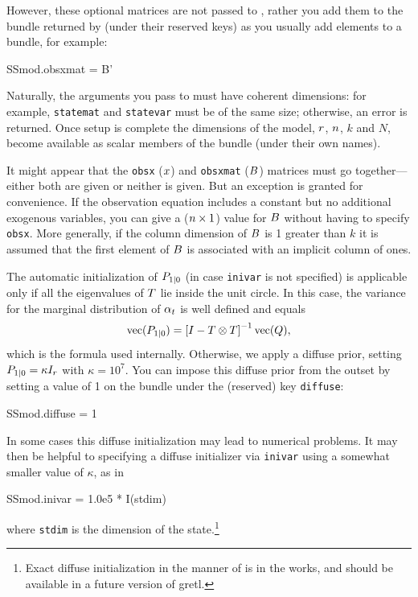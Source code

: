 However, these optional matrices are not passed to ,
rather you add them to the bundle returned by  (under
their reserved keys) as you usually add elements to a bundle, for
example:
\begin{code}
SSmod.obsxmat = B'
\end{code}

Naturally, the arguments you pass to  must have coherent
dimensions: for example, \texttt{statemat} and \texttt{statevar} must
be of the same size; otherwise, an error is returned. Once setup is
complete the dimensions of the model, $r$, $n$, $k$ and
$N$, become available as scalar members of the bundle (under their own
names).

It might appear that the \texttt{obsx} ($x$) and \texttt{obsxmat}
($B$) matrices must go together---either both are given or
neither is given.  But an exception is granted for convenience.  If
the observation equation includes a constant but no additional
exogenous variables, you can give a ($n \times 1$) value for
$B$ without having to specify \texttt{obsx}.  More generally,
if the column dimension of $B$ is 1 greater than $k$ it is
assumed that the first element of $B$ is associated with an
implicit column of ones.

The automatic initialization of $P_{1|0}$ (in case
\texttt{inivar} is not specified) is applicable only if all the
eigenvalues of $T$ lie inside the unit circle. In this case,
the variance for the marginal distribution of $\alpha_t$ is well
defined and equals
\[
\mbox{vec}(P_{1|0}) = \left[ I - T \otimes T
\right]^{-1} \mbox{vec}(Q) ,
\]
which is the formula used internally. Otherwise, we apply a diffuse
prior, setting $P_{1|0} = \kappa I_r$ with $\kappa = 10^7$.
You can impose this diffuse prior from the outset by setting a value
of 1 on the bundle under the (reserved) key \texttt{diffuse}:
%
\begin{code}
SSmod.diffuse = 1
\end{code}
%
In some cases this diffuse initialization may lead to numerical
problems. It may then be helpful to specifying a diffuse initializer
via \texttt{inivar} using a somewhat smaller value of $\kappa$, as in
%
\begin{code}
SSmod.inivar = 1.0e5 * I(stdim)
\end{code}
where \texttt{stdim} is the dimension of the state.\footnote{Exact
  diffuse initialization in the manner of \cite{koopman97} is in the
  works, and should be available in a future version of gretl.}

